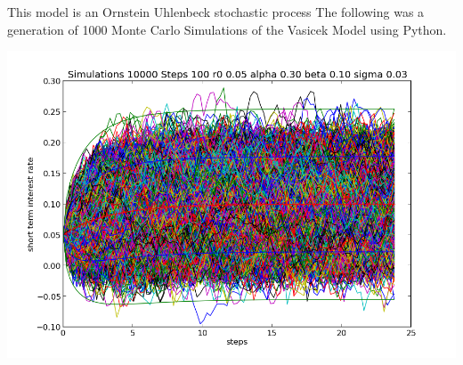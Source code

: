 This model is an Ornstein Uhlenbeck stochastic process
The following was a generation of 1000 Monte Carlo Simulations of the Vasicek Model using Python.
\begin{center}
 \includegraphics[bb=0 0 672 459,scale=0.5]{monte_carlo_simulation_interestrates.png}
\end{center}

